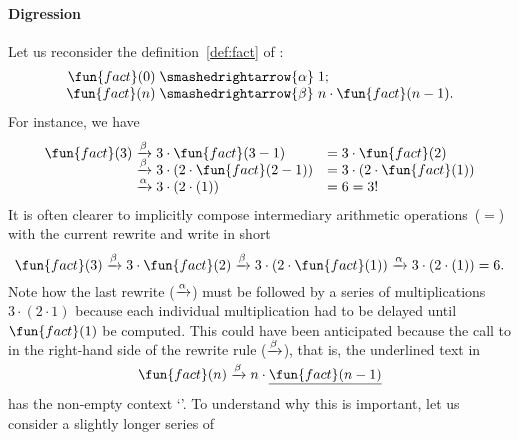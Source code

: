 \paragraph{Digression}

Let us reconsider the definition~\eqref{def:fact} of
 :
\begin{equation*}
\begin{array}{r@{\;}l@{\;}l}
\fun{fact}(0) & \smashedrightarrow{\alpha} & 1;\\
\fun{fact}(n) & \smashedrightarrow{\beta} & n \cdot \fun{fact}(n-1).
\end{array}
\end{equation*}
For instance, we have
\begin{equation*}
\begin{array}{r@{\;}c@{\;}lc@{\;}l}
\fun{fact}(3) & \xrightarrow{\beta} & 3 \cdot \fun{fact}(3-1)
              & = & 3 \cdot \fun{fact}(2)\\
              & \xrightarrow{\smash[t]{\beta}} &
              3 \cdot (2 \cdot \fun{fact}(2-1))
              & = & 3 \cdot (2 \cdot \fun{fact}(1))\\
              & \xrightarrow{\smash[t]{\alpha}} &
                3 \cdot (2 \cdot (1)) & = & 6 = 3!
\end{array}
\end{equation*}
It is often clearer to implicitly compose intermediary arithmetic
operations~(\(=\)) with the current rewrite and write in short
\begin{equation*}
\fun{fact}(3) \xrightarrow{\beta} 3 \cdot \fun{fact}(2)
\xrightarrow{\smash[t]{\beta}} 3 \cdot (2 \cdot \fun{fact}(1))
\xrightarrow{\smash[t]{\alpha}} 3 \cdot (2 \cdot (1)) = 6.
\end{equation*}
Note how the last rewrite (\(\xrightarrow{\smash[t]{\alpha}}\)) must
be followed by a series of multiplications~\(3 \cdot (2 \cdot 1)\)
because each individual multiplication had to be delayed until
\(\fun{fact}(1)\) be computed. This could have been anticipated
because the call to  in the right\hyp{}hand side of the
rewrite rule (\(\xrightarrow{\smash[t]{\beta}}\)), that is, the
underlined text in
\begin{equation*}
\fun{fact}(n) \xrightarrow{\smash[t]{\beta}} n \cdot \underline{\fun{fact}(n-1)}
\end{equation*}
has the non\hyp{}empty context
`'. To understand why this is
important, let us consider a slightly longer series of
